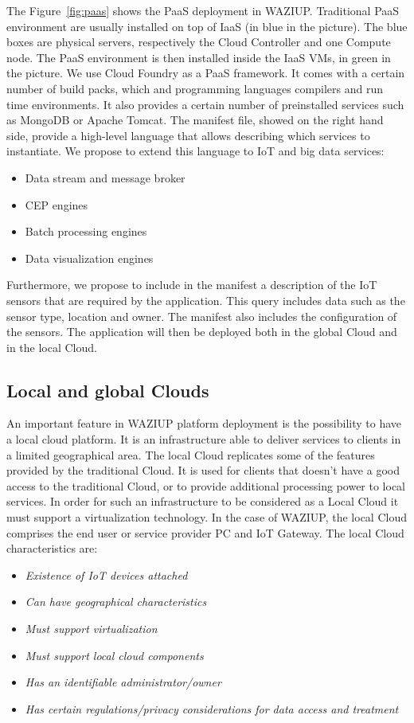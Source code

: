 The Figure~\ref{fig:paas} shows the PaaS deployment in WAZIUP.
Traditional PaaS environment are usually installed on top of IaaS (in blue in the picture).
The blue boxes are physical servers, respectively the Cloud Controller and one Compute node.
The PaaS environment is then installed inside the IaaS VMs, in green in the picture.
We use Cloud Foundry as a PaaS framework.
It comes with a certain number of build packs, which and programming languages compilers and run time environments.
It also provides a certain number of preinstalled services such as MongoDB or Apache Tomcat.
The manifest file, showed on the right hand side, provide a high-level language that allows describing which services to instantiate.
We propose to extend this language to IoT and big data services:
\begin{itemize}
  \item Data stream and message broker
  \item CEP engines
  \item Batch processing engines
  \item Data visualization engines
\end{itemize}

Furthermore, we propose to include in the manifest a description of the IoT sensors that are required by the application.
This query includes data such as the sensor type, location and owner.
The manifest also includes the configuration of the sensors.
The application will then be deployed both in the global Cloud and in the local Cloud.

\subsection{Local and global Clouds}

An important feature in WAZIUP platform deployment is the possibility to have a local cloud platform. 
It  is an infrastructure able to deliver services to clients in a limited geographical area. 
The local Cloud replicates some of the features provided by the traditional Cloud. 
It is used for clients that doesn't have a good access to the traditional Cloud, or to provide additional processing power to local services. 
In order for such an infrastructure to be considered as a Local Cloud it must support a virtualization technology. 
In the case of WAZIUP, the local Cloud comprises the end user or service provider PC and IoT Gateway. 
The local Cloud characteristics are:

\begin{itemize}
    \item \emph{Existence of IoT devices attached}
    \item \emph{Can have geographical characteristics}
    \item \emph{Must support virtualization}
    \item \emph{Must support local cloud components}
    \item \emph{Has an identifiable administrator/owner}
    \item \emph{Has certain regulations/privacy considerations for data access and treatment}
\end{itemize}

